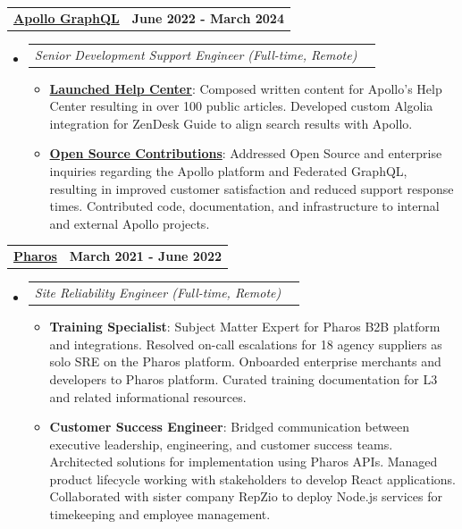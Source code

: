 \documentclass[letterpaper,10.8pt]{article}
\makeatletter
\newcommand{\resumeItem}[2]{
  \item\small{
    \textbf{#1}{: #2 \vspace{-2pt}}
  }
}
\newcommand{\jobLineItem}[2]{
  \vspace{0pt}\item[]
    \begin{tabular*}{0.98\textwidth}{l@{\extracolsep{\fill}}r}
      \textit{#1} & \textit{\small #2} \\
    \end{tabular*}\vspace{-4pt}
}
\newcommand{\employerTitle}[3]{
  \begin{tabular*}{1\textwidth}{l@{\extracolsep{\fill}}r}
    \href{#1}{\textbf{#2}} & \textbf{#3} \\
  \end{tabular*}\vspace{-4pt}
}
\newcommand{\resumeSubHeadingListStart}{\begin{itemize}[leftmargin=*]}
\newcommand{\resumeSubHeadingListEnd}{\end{itemize}}
\newcommand{\resumeItemListStart}{\begin{itemize}}
\newcommand{\resumeItemListEnd}{\end{itemize}\vspace{-5pt}}
\makeatother
\begin{document}
  \employerTitle
    {https://apollographql.com}{Apollo GraphQL}{June 2022 - March 2024}
  \resumeSubHeadingListStart
    \jobLineItem
      {Senior Development Support Engineer (Full-time, Remote)}{}
      \resumeItemListStart
        \resumeItem{\href{https://support.apollographql.com/}{Launched Help Center}}{Composed written content for Apollo’s Help Center resulting in over 100 public articles. Developed custom Algolia integration for ZenDesk Guide to align search results with Apollo.}
        \resumeItem{\href{https://stackoverflow.com/users/9281567/kyle-obrien}{Open Source Contributions}}{Addressed Open Source and enterprise inquiries regarding the Apollo platform and Federated GraphQL, resulting in improved customer satisfaction and reduced support response times. Contributed code, documentation, and infrastructure to internal and external Apollo projects.}
      \resumeItemListEnd
  \resumeSubHeadingListEnd

  \employerTitle
    {https://app.pharoscrm.com}{Pharos}{March 2021 - June 2022}
  \resumeSubHeadingListStart
    \jobLineItem
      {Site Reliability Engineer (Full-time, Remote)}{}
      \resumeItemListStart
        \resumeItem{Training Specialist}{Subject Matter Expert for Pharos B2B platform and integrations. Resolved on-call escalations for 18 agency suppliers as solo SRE on the Pharos platform. Onboarded enterprise merchants and developers to Pharos platform. Curated training documentation for L3 and related informational resources.}
        \resumeItem{Customer Success Engineer}{Bridged communication between executive leadership, engineering, and customer success teams. Architected solutions for implementation using Pharos APIs. Managed product lifecycle working with stakeholders to develop React applications. Collaborated with sister company RepZio to deploy Node.js services for timekeeping and employee management.}
      \resumeItemListEnd
  \resumeSubHeadingListEnd
\end{document}
